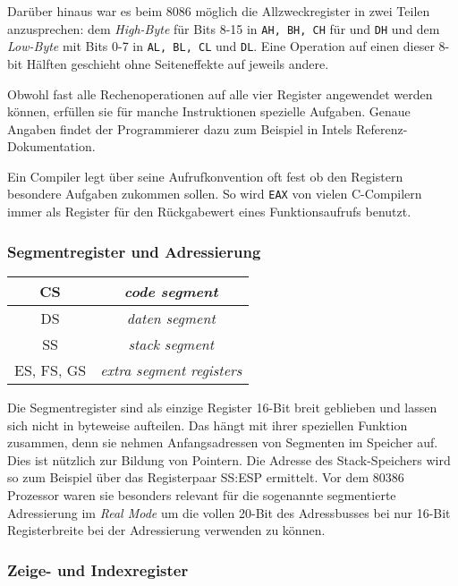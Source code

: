 Darüber hinaus war es beim 8086 möglich die Allzweckregister in zwei Teilen anzusprechen: dem \emph{High-Byte} für Bits 8-15 in {\tt AH, BH, CH} für  und {\tt DH} und dem \emph{Low-Byte} mit Bits 0-7 in {\tt AL, BL, CL} und {\tt DL}. Eine Operation auf einen dieser 8-bit Hälften geschieht ohne Seiteneffekte auf jeweils andere.

Obwohl fast alle Rechenoperationen auf alle vier Register angewendet werden können, erfüllen sie für manche Instruktionen spezielle Aufgaben. Genaue Angaben findet der Programmierer dazu zum Beispiel in Intels Referenz-Dokumentation. \cite{intelreferenz}

Ein Compiler legt über seine Aufrufkonvention oft fest ob den Registern besondere Aufgaben zukommen sollen. So wird {\tt EAX} von vielen C-Compilern immer als Register für den Rückgabewert eines Funktionsaufrufs benutzt. \cite{wp:callconv}

\subsubsection{Segmentregister und Adressierung}

\begin{tabular}{|c|c|}
\hline CS & \emph{code segment} \\
\hline DS & \emph{daten segment} \\
\hline SS & \emph{stack segment} \\
\hline ES, FS, GS & \emph {extra segment registers} \\
\hline
\end{tabular}

Die Segmentregister sind als einzige Register 16-Bit breit geblieben und lassen sich nicht in byteweise aufteilen. Das hängt mit ihrer speziellen Funktion zusammen, denn sie nehmen Anfangsadressen von Segmenten im Speicher auf. Dies ist nützlich zur Bildung von Pointern. Die Adresse des Stack-Speichers wird so zum Beispiel über das Registerpaar SS:ESP ermittelt. Vor dem 80386 Prozessor waren sie besonders relevant für die sogenannte segmentierte Adressierung im \emph{Real Mode} um die vollen 20-Bit des Adressbusses bei nur 16-Bit Registerbreite bei der Adressierung verwenden zu können.


\subsubsection{Zeige- und Indexregister}

